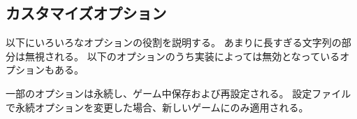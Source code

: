 \subsection*{カスタマイズオプション}

以下にいろいろなオプションの役割を説明する。
あまりに長すぎる文字列の部分は無視される。
以下のオプションのうち実装によっては無効となっているオプションもある。

一部のオプションは永続し、ゲーム中保存および再設定される。
設定ファイルで永続オプションを変更した場合、新しいゲームにのみ適用される。

